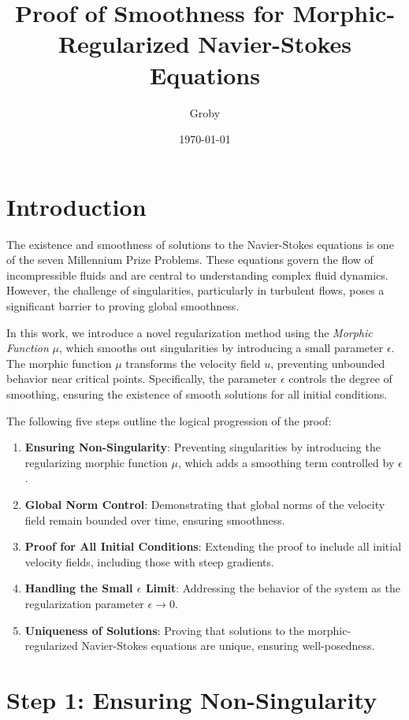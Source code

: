 \documentclass{article}
\title{Proof of Smoothness for Morphic-Regularized Navier-Stokes Equations}
\author{Groby}
\date{\today}
\begin{document}
\maketitle

\section*{Introduction}

The existence and smoothness of solutions to the Navier-Stokes equations is one of the seven Millennium Prize Problems. These equations govern the flow of incompressible fluids and are central to understanding complex fluid dynamics. However, the challenge of singularities, particularly in turbulent flows, poses a significant barrier to proving global smoothness. 

In this work, we introduce a novel regularization method using the \textit{Morphic Function} \( \mu \), which smooths out singularities by introducing a small parameter \( \epsilon \). The morphic function \( \mu \) transforms the velocity field \( u \), preventing unbounded behavior near critical points. Specifically, the parameter \( \epsilon \) controls the degree of smoothing, ensuring the existence of smooth solutions for all initial conditions.

The following five steps outline the logical progression of the proof:
\begin{enumerate}
    \item \textbf{Ensuring Non-Singularity}: Preventing singularities by introducing the regularizing morphic function \( \mu \), which adds a smoothing term controlled by \( \epsilon \).
    \item \textbf{Global Norm Control}: Demonstrating that global norms of the velocity field remain bounded over time, ensuring smoothness.
    \item \textbf{Proof for All Initial Conditions}: Extending the proof to include all initial velocity fields, including those with steep gradients.
    \item \textbf{Handling the Small \(\epsilon\) Limit}: Addressing the behavior of the system as the regularization parameter \( \epsilon \to 0 \).
    \item \textbf{Uniqueness of Solutions}: Proving that solutions to the morphic-regularized Navier-Stokes equations are unique, ensuring well-posedness.
\end{enumerate}

\section*{Step 1: Ensuring Non-Singularity}
\end{document}
